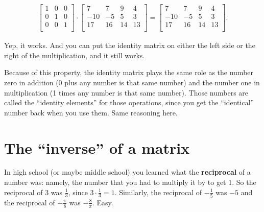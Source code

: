\vspace{-.15in}
\begin{align*}
\begin{bmatrix}
1 & 0 & 0 \\
0 & 1 & 0 \\
0 & 0 & 1 \\
\end{bmatrix} \cdot
\begin{bmatrix}
7 & 7 & 9 & 4 \\
-10 & -5 & 5 & 3 \\
17 & 16 & 14 & 13 \\
\end{bmatrix} =
\begin{bmatrix}
7 & 7 & 9 & 4 \\
-10 & -5 & 5 & 3 \\
17 & 16 & 14 & 13 \\
\end{bmatrix}.
\end{align*}
\vspace{-.15in}

Yep, it works. And you can put the identity matrix on either the left side or
the right of the multiplication, and it still works.


Because of this property, the identity matrix plays the same role as the number
zero in addition (0 plus any number is that same number) and the number one in
multiplication (1 times any number is that same number). Those numbers are
called the ``identity elements'' for those operations, since you get the
``identical'' number back when you use them. Same reasoning here.

\section{The ``inverse'' of a matrix}


In high school (or maybe middle school) you learned what the
\textbf{reciprocal} of a number was: namely, the number that you had to
multiply it by to get 1. So the reciprocal of $3$ was $\frac{1}{3}$, since $3
\cdot \frac{1}{3} = 1$. Similarly, the reciprocal of $-\frac{1}{5}$ was $-5$
and the reciprocal of $-\frac{\pi}{8}$ was $-\frac{8}{\pi}$. Easy.


